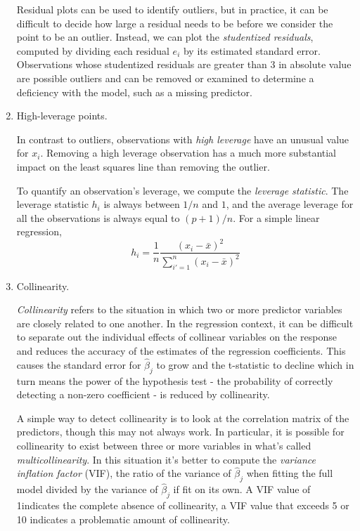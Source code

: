 \documentclass{article}
\begin{document}
\begin{enumerate}
    Residual plots can be used to identify outliers, but in practice, it can be difficult to decide how large a residual needs to be before we consider the point to be an outlier. Instead, we can plot the \textit{studentized residuals}, computed by dividing each residual $e_i$ by its estimated standard error. Observations whose studentized residuals are greater than 3 in absolute value are possible outliers and can be removed or examined to determine a deficiency with the model, such as a missing predictor.
    
    \item High-leverage points.
    
    In contrast to outliers, observations with \textit{high leverage} have an unusual value for $x_i$. Removing a high leverage observation has a much more substantial impact on the least squares line than removing the outlier.
    
    To quantify an observation’s leverage, we compute the \textit{leverage statistic}. The leverage statistic $h_i$ is always between $1/n$ and $1$, and the average leverage for all the observations is always equal to $(p + 1)/n$. For a simple linear regression,
    \[
        h_i =  \frac{1}{n} \frac{(x_i - \bar x)^2}{\sum_{i' = 1}^n (x_i - \bar x)^2}
    \]
    
    \item Collinearity.
    
    \textit{Collinearity} refers to the situation in which two or more predictor variables are closely related to one another. In the regression context, it can be difficult to separate out the individual effects of collinear variables on the response and reduces the accuracy of the estimates of the regression coefficients. This causes the standard error for $\hat \beta_j$ to grow and the t-statistic to decline which in turn means the power of the hypothesis test - the probability of correctly detecting a non-zero coefficient - is reduced by collinearity.
    
    A simple way to detect collinearity is to look at the correlation matrix of the predictors, though this may not always work. In particular, it is possible for collinearity to exist between three or more variables in what's called \textit{multicollinearity}. In this situation it's better to compute the \textit{variance inflation factor} (VIF), the ratio of the variance of $\hat \beta_j$ when fitting the full model divided by the variance of $\hat \beta_j$ if fit on its own. A VIF value of 1indicates the complete absence of collinearity, a VIF value that exceeds 5 or 10 indicates a problematic amount of collinearity.
    

\end{enumerate}
\end{document}
